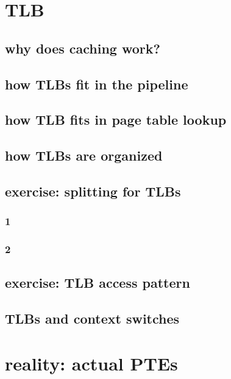 \section{TLB}
\subsection{why does caching work?}


\subsection{how TLBs fit in the pipeline}


\subsection{how TLB fits in page table lookup}


\subsection{how TLBs are organized}

\subsection{exercise: splitting for TLBs}
\subsubsection{1}

\subsubsection{2}



\subsection{exercise: TLB access pattern}




\subsection{TLBs and context switches}


\section{reality: actual PTEs}



